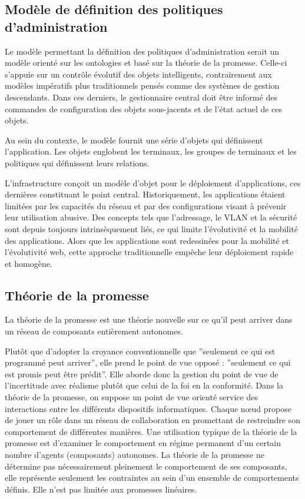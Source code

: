 \subsection{Modèle de définition des politiques d'administration}

Le modèle permettant la définition des politiques d'administration serait un
modèle orienté sur les ontologies et basé sur la théorie de la promesse.
Celle-ci s'appuie sur un contrôle évolutif des objets intelligents,
contrairement aux modèles impératifs plus traditionnels pensés comme des
systèmes de gestion descendants. Dans ces derniers, le gestionnaire central
doit être informé des commandes de configuration des objets sous-jacents et de
l'état actuel de ces objets.

Au sein du contexte, le modèle fournit une série d'objets qui définissent
l'application. Les objets englobent les terminaux, les groupes de terminaux et
les politiques qui définissent leurs relations.

L'infrastructure conçoit un modèle d'objet pour le déploiement d'applications,
ces dernières constituant le point central. Historiquement, les applications
étaient limitées par les capacités du réseau et par des configurations visant à
prévenir leur utilisation abusive. Des concepts tels que l'adressage, le VLAN et
la sécurité sont depuis toujours intrinsèquement liés, ce qui limite
l'évolutivité et la mobilité des applications. Alors que les applications sont
redessinées pour la mobilité et l'évolutivité web, cette approche traditionnelle
empêche leur déploiement rapide et homogène.

\subsection{Théorie de la promesse}

La théorie de la promesse est une théorie nouvelle sur ce qu'il peut arriver
dans un réseau de composants entièrement autonomes.

Plutôt que d'adopter la croyance conventionnelle que ''seulement ce qui est
programmé peut arriver'', elle prend le point de vue opposé : ''seulement ce
qui est promis peut être prédit''. Elle aborde donc la gestion du point de vue
de l'incertitude avec réalisme plutôt que celui de la foi en la conformité. Dans
la théorie de la promesse, on suppose un point de vue orienté service des
interactions entre les différents dispositifs informatiques. Chaque nœud propose
de jouer un rôle dans un réseau de collaboration en promettant de restreindre
son comportement de différentes manières. Une utilisation typique de la théorie
de la promesse est d'examiner le comportement en régime permanent d'un certain
nombre d'agents (composants) autonomes. La théorie de la promesse ne détermine
pas nécessairement pleinement le comportement de ses composants, elle représente
seulement les contraintes au sein d'un ensemble de comportements définis. Elle
n'est pas limitée aux promesses linéaires.

